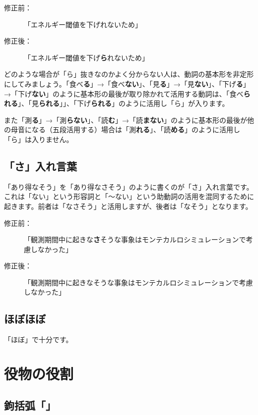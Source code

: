 \begin{description}
\item[修正前：]「エネルギー閾値を下げれないため」
\item[修正後：]「エネルギー閾値を下げ{\bf ら}れないため」
\end{description}

どのような場合が「ら」抜きなのかよく分からない人は、動詞の基本形を非定形にしてみましょう。「食べ{\bf る}」→「食べ{\bf ない}」、「見{\bf る}」→「見{\bf ない}」、「下げ{\bf る}」→「下げ{\bf ない}」のように基本形の最後が取り除かれて活用する動詞は、「食べ{\bf られる}」、「見{\bf られる}」」、「下げ{\bf られる}」のように活用し「ら」が入ります。

また「測{\bf る}」→「測{\bf らない}」、「読{\bf む}」→「読{\bf まない}」のように基本形の最後が他の母音になる（五段活用する）場合は「測{\bf れる}」、「読{\bf める}」のように活用し「ら」は入りません。

\subsection{「さ」入れ言葉}

「あり得なそう」を「あり得なさそう」のように書くのが「さ」入れ言葉です。これは「ない」という形容詞と「〜ない」という助動詞の活用を混同するために起きます。前者は「なさそう」と活用しますが、後者は「なそう」となります。

\begin{description}
\item[修正前：]「観測期間中に起きな{\bf さ}そうな事象はモンテカルロシミュレーションで考慮しなかった」
\item[修正後：]「観測期間中に起きなそうな事象はモンテカルロシミュレーションで考慮しなかった」
\end{description}

\subsection{ほぼほぼ}

「ほぼ」で十分です。

\section{役物の役割}

\subsection{鉤括弧「」}

